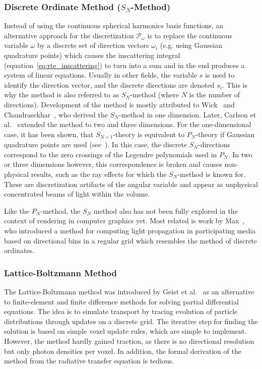 \subsubsection*{Discrete Ordinate Method ($S_N$-Method)}
Instead of using the continuous spherical harmonics basis functions, an alternative approach for the discretization $\mathcal{P}_\omega$ is to replace the continuous variable $\omega$ by a discrete set of direction vectors $\omega_i$ (e.g. using Gaussian quadrature points) which causes the inscattering integral (equation~\ref{eq:rte_inscattering}) to turn into a sum and in the end produces a system of linear equations. Usually in other fields, the variable $s$ is used to identify the direction vector, and the discrete directions are denoted $s_i$. This is why the method is also referred to as $S_N$-method (where $N$ is the number of directions). Development of the method is mostly attributed to Wick~\cite{Wick43} and Chandrasekhar~\cite{Chandrasekhar60}, who derived the $S_N$-method in one dimension. Later, Carlson et al.~\cite{Carlson61} extended the method to two and three dimensions. For the one-dimensional case, it has been shown, that $S_{N+1}$-theory is equivalent to $P_N$-theory if Gaussian quadrature points are used (see~\cite{Cullen01}). In this case, the discrete $S_N$-directions correspond to the zero crossings of the Legendre polynomials used in $P_N$. In two or three dimensions however, this correspondence is broken and causes non-physical results, such as the ray effects for which the $S_N$-method is known for. These are discretization artifacts of the angular variable and appear as unphysical concentrated beams of light within the volume. 

Like the $P_N$-method, the $S_N$ method also has not been fully explored in the context of rendering in computer graphics yet. Most related is work by Max~\cite{Max95}, who introduced a method for computing light propagation in participating media based on directional bins in a regular grid which resembles the method of discrete ordinates.


\subsubsection*{Lattice-Boltzmann Method}

The Lattice-Boltzmann method was introduced by Geist et al.~\cite{Geist04} as an alternative to finite-element and finite difference methods for solving partial differential equations. The idea is to simulate transport by tracing evolution of particle distributions through updates on a discrete grid. The iterative step for finding the solution is based on simple voxel update rules, which are simple to implement. However, the method hardly gained traction, as there is no directional resolution but only photon densities per voxel. In addition, the formal derivation of the method from the radiative transfer equation is tedious.

